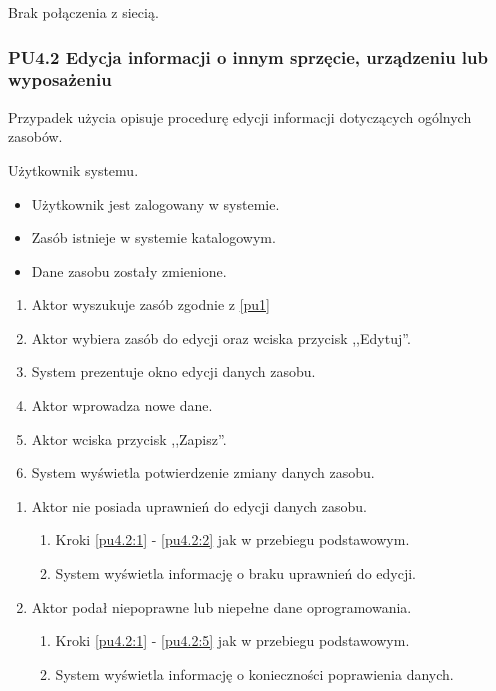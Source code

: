 Brak połączenia z siecią.

\subsubsection{PU4.2 Edycja informacji o innym sprzęcie, urządzeniu lub wyposażeniu}

Przypadek użycia opisuje procedurę edycji informacji dotyczących ogólnych zasobów.

Użytkownik systemu.

\begin{itemize}
\item Użytkownik jest zalogowany w systemie.
\item Zasób istnieje w systemie katalogowym.
\end{itemize}

\begin{itemize}
\item Dane zasobu zostały zmienione.
\end{itemize}

\begin{enumerate}
\item \label{pu4.2:1} Aktor wyszukuje zasób zgodnie z \ref{pu1}
\item \label{pu4.2:2} Aktor wybiera zasób do edycji oraz wciska przycisk ,,Edytuj''.
\item System prezentuje okno edycji danych zasobu.
\item Aktor wprowadza nowe dane.
\item \label{pu4.2:5} Aktor wciska przycisk ,,Zapisz''.
\item System wyświetla potwierdzenie zmiany danych zasobu.
\end{enumerate}

\begin{enumerate}
\item Aktor nie posiada uprawnień do edycji danych zasobu.
	\begin{enumerate}[label*=\arabic*.]
		\item Kroki \ref{pu4.2:1} - \ref{pu4.2:2} jak w przebiegu podstawowym.
		\item System wyświetla informację o braku uprawnień do edycji.
	\end{enumerate}
\item Aktor podał niepoprawne lub niepełne dane oprogramowania.
	\begin{enumerate}[label*=\arabic*.]
		\item Kroki \ref{pu4.2:1} - \ref{pu4.2:5} jak w przebiegu podstawowym.
		\item System wyświetla informację o konieczności poprawienia danych.
	\end{enumerate}
\end{enumerate}

